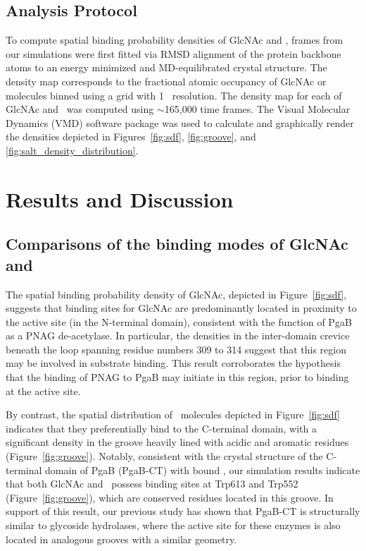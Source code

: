 \subsection*{Analysis Protocol}
To compute spatial binding probability densities of GlcNAc and \glucosamine, frames from our simulations were first fitted via RMSD alignment of the protein backbone atoms to an energy minimized and MD-equilibrated crystal structure. The density map corresponds to the fractional atomic occupancy of GlcNAc or \glucosamine molecules binned using a grid with 1 \angstrom\ resolution.  The density map for each of GlcNAc and \glucosamine\ was computed using $\sim$165,000 time frames. The Visual Molecular Dynamics (VMD) software package\cite{Humphrey:1996to} was used to calculate and graphically render the densities depicted in Figures~\ref{fig:sdf}, \ref{fig:groove}, and \ref{fig:salt_density_distribution}.

\section{Results and Discussion}


\subsection{Comparisons of the binding modes of GlcNAc and \glucosamine}

The spatial binding probability density of GlcNAc, depicted in Figure~\ref{fig:sdf}, suggests that binding sites for GlcNAc are predominantly located in proximity to the active site (in the N-terminal domain), consistent with the function of PgaB as a PNAG de-acetylase. In particular, the densities in the inter-domain crevice beneath the loop spanning residue numbers 309 to 314 suggest that this region may be involved in substrate binding.  This result corroborates the hypothesis that the binding of PNAG to PgaB may initiate in this region, prior to binding at the active site.\cite{Little:2012dp} 




By contrast, the spatial distribution of \glucosamine\ molecules depicted in Figure~\ref{fig:sdf} indicates that they preferentially bind to the C-terminal domain, with a significant density in the groove heavily lined with acidic and aromatic residues (Figure~\ref{fig:groove}).
Notably, consistent with the crystal structure of the C-terminal domain of PgaB (PgaB-CT) with bound \glucosamine, our simulation results indicate that both GlcNAc and \glucosamine\ possess binding sites at Trp613 and Trp552  (Figure~\ref{fig:groove}), which are conserved residues located in this groove.\cite{Little:2012dp}
In support of this result, our previous study has shown that PgaB-CT is structurally similar to glycoside hydrolases,\cite{Little:2012dp} where the active site for these enzymes is also located in analogous grooves with a similar geometry. 


